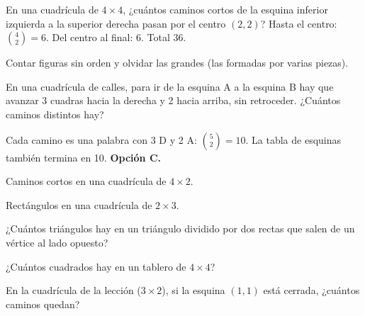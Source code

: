 \begin{ejemplo}
En una cuadrícula de $4 \times 4$, ¿cuántos caminos cortos de la esquina inferior izquierda a la superior derecha pasan por
el centro $(2, 2)$?
\solucion Hasta el centro: $\binom42 = 6$. Del centro al final: 6. Total $36$.
\end{ejemplo}

\begin{trampa}
Contar figuras sin orden y olvidar las grandes (las formadas por varias piezas).
\end{trampa}

\begin{reto}
En una cuadrícula de calles, para ir de la esquina A a la esquina B hay que avanzar 3 cuadras hacia la derecha y 2 hacia
arriba, sin retroceder. ¿Cuántos caminos distintos hay?
\end{reto}

\begin{retoresuelto}
Cada camino es una palabra con 3 D y 2 A: $\binom52 = 10$. La tabla de esquinas también termina en 10.
\textbf{Opción C.}
\end{retoresuelto}

\taller
{}
\begin{ejercicios}
\item Caminos cortos en una cuadrícula de $4 \times 2$. 
\item Rectángulos en una cuadrícula de $2 \times 3$. 
\item ¿Cuántos triángulos hay en un triángulo dividido por dos rectas que salen de un vértice al lado opuesto? 
\end{ejercicios}
\begin{ejercicios}
\item ¿Cuántos cuadrados hay en un tablero de $4 \times 4$?
\item En la cuadrícula de la lección ($3 \times 2$), si la esquina $(1, 1)$ está cerrada, ¿cuántos caminos quedan?
\end{ejercicios}

\bitacora

